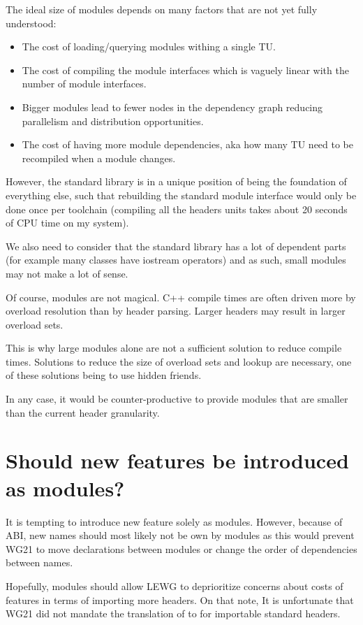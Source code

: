 \documentclass{wg21}
\begin{document}
The ideal size of modules depends on many factors that are not yet fully understood:

\begin{itemize}
\item The cost of loading/querying modules withing a single TU.
\item The cost of compiling the module interfaces which is vaguely linear with the number of module interfaces.
\item Bigger modules lead to fewer nodes in the dependency graph reducing parallelism and distribution opportunities.
\item The cost of having more module dependencies, aka how many TU need to be recompiled when a module changes.
\end{itemize}

However, the standard library is in a unique position of being the foundation of everything else, such that rebuilding
the standard module interface would only be done once per toolchain (compiling all the headers units takes about 20 seconds of CPU time on my system).

We also need to consider that the standard library has a lot of dependent parts (for example many classes have iostream operators) and as such, small modules may not make a lot of sense.

Of course, modules are not magical. C++ compile times are often driven more by overload resolution than by header parsing.
Larger headers may result in larger overload sets.

This is why large modules alone are not a sufficient solution to reduce compile times.
Solutions to reduce the size of overload sets and lookup are necessary, one of these solutions being to use hidden friends.

In any case, it would be counter-productive to provide modules that are smaller than the current header granularity.

\section{Should new features be introduced as modules?}

It is tempting to introduce new feature solely as modules.
However, because of ABI, new names should most likely not be own by modules as this would prevent WG21 to move
declarations between modules or change the order of dependencies between names.

Hopefully, modules should allow LEWG to deprioritize concerns about costs of features in terms 
of importing more headers.
On that note, It is unfortunate that WG21 did not mandate the translation of  to  for importable standard
headers. 
\end{document}
